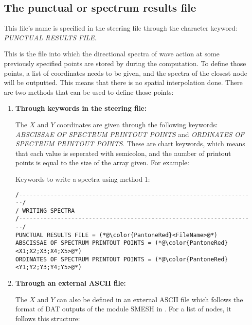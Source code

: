 \subsection{ The punctual or spectrum results file}
\label{se:SpeFile}

This file's name is specified in the steering file through the character keyword:
\textit{PUNCTUAL RESULTS FILE.}

This is the file into which the directional spectra of wave action at some previously
specified points are stored by \tomawac during the computation. To define those points,
a list of coordinates needs to be given, and the spectra of the closest node will be
outputted. This means that there is no spatial interpolation done. There are two methods
that can be used to define those points:

\begin{enumerate}

\item \textbf{Through keywords in the steering file:}

The $X$ and $Y$ coordinates are given through the following keywords:
\textit{ABSCISSAE OF SPECTRUM PRINTOUT POINTS} and \textit{ORDINATES OF SPECTRUM
  PRINTOUT POINTS}.
These are chart keywords, which means that each value is seperated with semicolon, and
the number of printout points is equal to the size of the array given. For example:

\begin{CommentBlock}{Keywords to write a spectra using method 1:}
\lstset{language=TelemacCas,
        basicstyle=\scriptsize\ttfamily}
\begin{lstlisting}[frame=trBL]
/--------------------------------------------------------------------/
/ WRITING SPECTRA
/--------------------------------------------------------------------/
PUNCTUAL RESULTS FILE = (*@\color{PantoneRed}<FileName>@*)
ABSCISSAE OF SPECTRUM PRINTOUT POINTS = (*@\color{PantoneRed}<X1;X2;X3;X4;X5>@*)
ORDINATES OF SPECTRUM PRINTOUT POINTS = (*@\color{PantoneRed}<Y1;Y2;Y3;Y4;Y5>@*)
\end{lstlisting}
\end{CommentBlock}

\item \textbf{Through an external ASCII file:}

  The $X$ and $Y$ can also be defined in an external ASCII file which follows the format
  of DAT outputs of the module {\scshape SMESH} in \salome{}. For a list of nodes, it
  follows this structure:


\end{enumerate}
